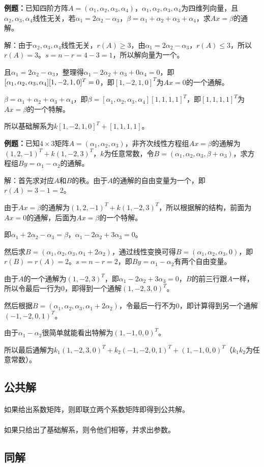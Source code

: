 \textbf{例题：}已知四阶方阵$A=(\alpha_1,\alpha_2,\alpha_3,\alpha_4)$，$\alpha_1,\alpha_2,\alpha_3,\alpha_4$为四维列向量，且$\alpha_2,\alpha_3,\alpha_4$线性无关，若$\alpha_1=2\alpha_2-\alpha_3$，$\beta=\alpha_1+\alpha_2+\alpha_3+\alpha_4$，求$Ax=\beta$的通解。

解：由于$\alpha_2,\alpha_3,\alpha_4$线性无关，$r(A)\geqslant3$，由$\alpha_1=2\alpha_2-\alpha_3$，$r(A)\leqslant3$，所以$r(A)=3$。$s=n-r=4-3=1$，所以解向量为一个。

且$\alpha_1=2\alpha_2-\alpha_3$，整理得$\alpha_1-2\alpha_2+\alpha_3+0\alpha_4=0$，即$[\alpha_1,\alpha_2,\alpha_3,\alpha_4][1,-2,1,0]^T\\=0$，即$[1,-2,1,0]^T$为$Ax=0$的一个通解。

$\beta=\alpha_1+\alpha_2+\alpha_3+\alpha_4$，即$\beta=[\alpha_1,\alpha_2,\alpha_3,\alpha_4][1,1,1,1]^T$，即$[1,1,1,1]^T$为$Ax=\beta$的一个特解。

所以基础解系为$k[1,-2,1,0]^T+[1,1,1,1]$。

\textbf{例题：}已知$4\times3$矩阵$A=(\alpha_1,\alpha_2,\alpha_3)$，非齐次线性方程组$Ax=\beta$的通解为$(1,2,-1)^T+k(1,-2,3)^T$，$k$为任意常数，令$B=(\alpha_1,\alpha_2,\alpha_3,\beta+\alpha_3)$，求方程组$By=\alpha_1-\alpha_2$的通解。

解：首先求对应$A$和$B$的秩。由于$A$的通解的自由变量为一个，即$r(A)=3-1=2$。

由于$Ax=\beta$的通解为$(1,2,-1)^T+k(1,-2,3)^T$，所以根据解的结构，前面为$Ax=0$的通解，后面为$Ax=\beta$的一个特解。

即$\alpha_1+2\alpha_2-\alpha_3=\beta$，$\alpha_1-2\alpha_2+3\alpha_3=0$。

然后求$B=(\alpha_1,\alpha_2,\alpha_3,\alpha_1+2\alpha_2)$，通过线性变换可得$B=(\alpha_1,\alpha_2,\alpha_3,0)$，即$r(B)=r(A)=2$。$s=n-r=2$，即$By=\alpha_1-\alpha_2$有两个自由变量。

由于$A$的一个通解为$(1,-2,3)^T$，即$\alpha_1-2\alpha_2+3\alpha_3=0$，$B$的前三行跟$A$一样，所以令最后一行为0，即得到一个通解$(1,-2,3,0)^T$。

然后根据$B=(\alpha_1,\alpha_2,\alpha_3,\alpha_1+2\alpha_2)$，令最后一行不为0，即计算得到另一个通解$(-1,-2,0,1)^T$。

由于$\alpha_1-\alpha_2$很简单就能看出特解为$(1,-1,0,0)^T$。

所以最后通解为$k_1(1,-2,3,0)^T+k_2(-1,-2,0,1)^T+(1,-1,0,0)^T$（$k_1k_2$为任意常数）。

\subsection{公共解}

\paragraph{}

如果给出系数矩阵，则即联立两个系数矩阵即得到公共解。

\paragraph{}

如果只给出了基础解系，则令他们相等，并求出参数。

\subsection{同解}
